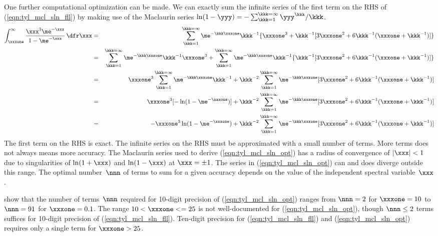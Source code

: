 \documentclass[12pt]{article}
\begin{document}
One further computational optimization can be made.
We can exactly sum the infinite series of the first term on the RHS of (\ref{eqn:tyl_mcl_sln_fll}) by making use of the Maclaurin series 
$\ln(1 - \yyy) = - \sum_{\kkk=1}^{\kkk=\infty} \yyy^{\kkk}/\kkk$.
\begin{eqnarray}
\int_{\xxxone}^{\infty} 
\frac{\xxx^{3}\me^{-\xxx}}{1 - \me^{-\xxx}} \,\dfr\xxx
 & = &
\sum_{\kkk=1}^{\kkk=\infty} \me^{-\kkk\xxxone}\kkk^{-1}\{\xxxone^{3} + \kkk^{-1}[3\xxxone^{2} + 6\kkk^{-1}(\xxxone + \kkk^{-1})]\} \nonumber \\
 & = &
\sum_{\kkk=1}^{\kkk=\infty} \me^{-\kkk\xxxone}\kkk^{-1}\xxxone^{3} + 
\sum_{\kkk=1}^{\kkk=\infty} \me^{-\kkk\xxxone}\kkk^{-1}\{\kkk^{-1}[3\xxxone^{2} + 6\kkk^{-1}(\xxxone + \kkk^{-1})]\} \nonumber \\
 & = &
\xxxone^{3} \sum_{\kkk=1}^{\kkk=\infty} \me^{-\kkk\xxxone}\kkk^{-1} + 
\kkk^{-2}\sum_{\kkk=1}^{\kkk=\infty} \me^{-\kkk\xxxone}[3\xxxone^{2} + 6\kkk^{-1}(\xxxone + \kkk^{-1})] \nonumber \\
 & = &
\xxxone^{3}[-\ln(1 - \me^{-\xxxone})] + 
\kkk^{-2}\sum_{\kkk=1}^{\kkk=\infty} \me^{-\kkk\xxxone}[3\xxxone^{2} + 6\kkk^{-1}(\xxxone + \kkk^{-1})] \nonumber \\
 & = &
-\xxxone^{3}\ln(1 - \me^{-\xxxone}) + 
\kkk^{-2}\sum_{\kkk=1}^{\kkk=\infty} \me^{-\kkk\xxxone}[3\xxxone^{2} + 6\kkk^{-1}(\xxxone + \kkk^{-1})]
\label{eqn:tyl_mcl_sln_opt}
\end{eqnarray}
The first term on the RHS is exact.
The infinite series on the RHS must be approximated with a small number of terms.
More terms does not always means more accuracy.
The Maclaurin series used to derive (\ref{eqn:tyl_mcl_sln_opt}) has a radius of convergence of $|\xxx| < 1$ due to singularities of $\ln(1+\xxx)$ and $\ln(1-\xxx)$ at $\xxx = \pm 1$.
The series in (\ref{eqn:tyl_mcl_sln_opt}) can and does diverge outside this range.
The optimal number~$\nnn$ of terms to sum for a given accuracy depends on the value of the independent spectral variable~$\xxx$.

\cite{WiW76} show that the number of terms~$\nnn$ required for 10-digit precision of (\ref{eqn:tyl_mcl_sln_opt}) ranges from $\nnn=2$ for $\xxxone = 10$ to $\nnn=91$ for $\xxxone = 0.1$.
The range $10 < \xxxone <= 25$ is not well-documented for (\ref{eqn:tyl_mcl_sln_opt}), though $\nnn \le 2$ terms suffices for 10-digit precision of (\ref{eqn:tyl_mcl_sln_fll}).
Ten-digit precision for (\ref{eqn:tyl_mcl_sln_fll}) and (\ref{eqn:tyl_mcl_sln_opt}) requires only a single term for $\xxxone > 25$.
\end{document}
